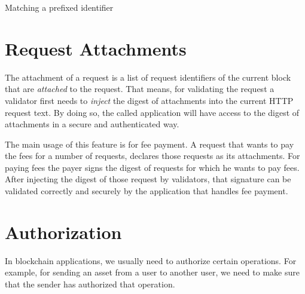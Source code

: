 \begin{algorithm}[h]
    \DontPrintSemicolon
    \BlankLine
    \BlankLine
    {
        {
            \;
        }
    }
    \;
    \caption{Matching a prefixed identifier}\label{alg:match_id}
\end{algorithm}

\section{Request Attachments}\label{sec:attachments}

The attachment of a request is a list of request identifiers of the current block that are \emph{attached} to the
request. That means, for validating the request a validator first needs to \emph{inject} the digest of attachments
into the current HTTP request text. By doing so, the called application will have access to the digest of
attachments in a secure and authenticated way.

The main usage of this feature is for fee payment. A request that wants to pay the fees for a number of requests,
declares those requests as its attachments. For paying fees the payer signs the digest of requests for which he
wants to pay fees. After injecting the digest of those request by validators, that signature can be validated
correctly and securely by the application that handles fee payment.


\section{Authorization}\label{sec:auth}

In blockchain applications, we usually need to authorize certain operations. For example, for sending an asset
from a user to another user, we need to make sure that the sender has authorized that operation.

